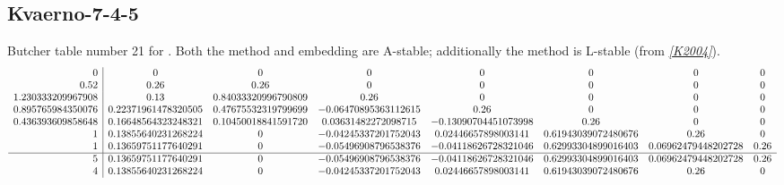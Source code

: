 \documentclass[letterpaper,10pt,english]{sphinxmanual}
\begin{document}
\subsection{Kvaerno-7-4-5}
\label{Butcher:kvaerno-7-4-5}\label{Butcher:butcher-kvaerno-7-4-5}
Butcher table number 21
for {\hyperref[c_interface/User_callable:c.ARKodeSetIRKTableNum]{\emph{}}}.  Both the
method and embedding are A-stable; additionally the method is
L-stable (from \label{Butcher:id20}{\hyperref[References:k2004]{\emph{{[}K2004{]}}}}).
\begin{gather}
\begin{split}\begin{array}{r|ccccccc}
  0 & 0 & 0 & 0 & 0 & 0 & 0 & 0 \\
  0.52 & 0.26 & 0.26 & 0 & 0 & 0 & 0 & 0 \\
  1.230333209967908 & 0.13 & 0.84033320996790809 & 0.26 & 0 & 0 & 0 & 0 \\
  0.895765984350076 & 0.22371961478320505 & 0.47675532319799699 & -0.06470895363112615 & 0.26 & 0 & 0 & 0 \\
  0.436393609858648 & 0.16648564323248321 & 0.10450018841591720 & 0.03631482272098715 & -0.13090704451073998 & 0.26 & 0 & 0 \\
  1 & 0.13855640231268224 & 0 & -0.04245337201752043 & 0.02446657898003141 & 0.61943039072480676 & 0.26 & 0 \\
  1 & 0.13659751177640291 & 0 & -0.05496908796538376 & -0.04118626728321046 & 0.62993304899016403 & 0.06962479448202728 & 0.26 \\
  \hline
  5 & 0.13659751177640291 & 0 & -0.05496908796538376 & -0.04118626728321046 & 0.62993304899016403 & 0.06962479448202728 & 0.26 \\
  4 & 0.13855640231268224 & 0 & -0.04245337201752043 & 0.02446657898003141 & 0.61943039072480676 & 0.26 & 0
\end{array}\end{split}\notag
\end{gather}\begin{figure}[htbp]
\centering
\capstart


\end{figure}
\end{document}
